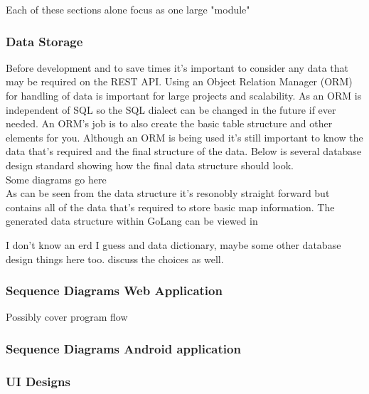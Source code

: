 Each of these sections alone focus as one large "module" 

\subsubsection{Data Storage}
Before development and to save times it's important to consider any data that may be required on the REST API. Using an Object Relation Manager (ORM) for handling of data is important for large projects and scalability. As an ORM is independent of SQL so the SQL dialect can be changed in the future if ever needed. An ORM's job is to also create the basic table structure and other elements for you. Although an ORM is being used it's still important to know the data that's required and the final structure of the data. Below is several database design standard showing how the final data structure should look.
\\
Some diagrams go here
\\
As can be seen from the data structure it's resonobly straight forward but contains all of the data that's required to store basic map information. The generated data structure within GoLang can be viewed in \appendixtemp

I don't know an erd I guess and data dictionary, maybe some other database design things here too. discuss the choices as well.

\subsubsection{Sequence Diagrams Web Application}
Possibly cover program flow

\subsubsection{Sequence Diagrams Android application}
\subsubsection{UI Designs}
